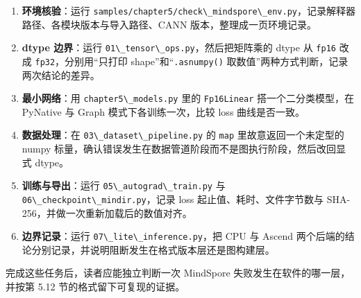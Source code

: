 \begin{enumerate}
\def\labelenumi{\arabic{enumi}.}
\tightlist
\item
  \textbf{环境核验}：运行
  \passthrough{\lstinline!samples/chapter5/check\_mindspore\_env.py!}，记录解释器路径、各模块版本与导入路径、CANN
  版本，整理成一页环境记录。
\item
  \textbf{dtype 边界}：运行
  \passthrough{\lstinline!01\_tensor\_ops.py!}，然后把矩阵乘的 dtype 从
  \passthrough{\lstinline!fp16!} 改成
  \passthrough{\lstinline!fp32!}，分别用``只打印
  shape''和``\passthrough{\lstinline!.asnumpy()!}
  取数值''两种方式判断，记录两次结论的差异。
\item
  \textbf{最小网络}：用 \passthrough{\lstinline!chapter5\_models.py!}
  里的 \passthrough{\lstinline!Fp16Linear!} 搭一个二分类模型，在
  PyNative 与 Graph 模式下各训练一次，比较 loss 曲线是否一致。
\item
  \textbf{数据处理}：在
  \passthrough{\lstinline!03\_dataset\_pipeline.py!} 的
  \passthrough{\lstinline!map!} 里故意返回一个未定型的 numpy
  标量，确认错误发生在数据管道阶段而不是图执行阶段，然后改回显式 dtype。
\item
  \textbf{训练与导出}：运行
  \passthrough{\lstinline!05\_autograd\_train.py!} 与
  \passthrough{\lstinline!06\_checkpoint\_mindir.py!}，记录 loss
  起止值、耗时、文件字节数与 SHA-256，并做一次重新加载后的数值对齐。
\item
  \textbf{边界记录}：运行
  \passthrough{\lstinline!07\_lite\_inference.py!}，把 CPU 与 Ascend
  两个后端的结论分别记录，并说明阻断发生在格式版本层还是图构建层。
\end{enumerate}

完成这些任务后，读者应能独立判断一次 MindSpore
失败发生在软件的哪一层，并按第 5.12 节的格式留下可复现的证据。
